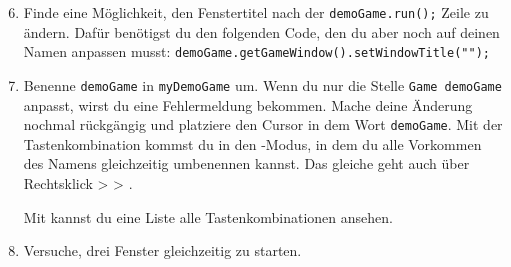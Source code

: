 \begin{enumerate} \setcounter{enumi}{5}
    \item \optional Finde eine Möglichkeit, den Fenstertitel nach der \lstinline{demoGame.run();} Zeile zu ändern.
        Dafür benötigst du den folgenden Code, den du aber noch auf deinen Namen anpassen musst: \lstinline{demoGame.getGameWindow().setWindowTitle("");}
    \item \optional Benenne \lstinline{demoGame} in \lstinline{myDemoGame} um.
        Wenn du nur die Stelle \lstinline{Game demoGame} anpasst, wirst du eine Fehlermeldung bekommen.
        Mache deine Änderung nochmal rückgängig und platziere den Cursor in dem Wort \lstinline{demoGame}.
        Mit der Tastenkombination  kommst du in den -Modus, in dem du alle Vorkommen des Namens gleichzeitig umbenennen kannst.
        Das gleiche geht auch über Rechtsklick >  > .

        Mit  kannst du eine Liste alle Tastenkombinationen ansehen.
    \item \optional Versuche, drei Fenster gleichzeitig zu starten. 
\end{enumerate}
